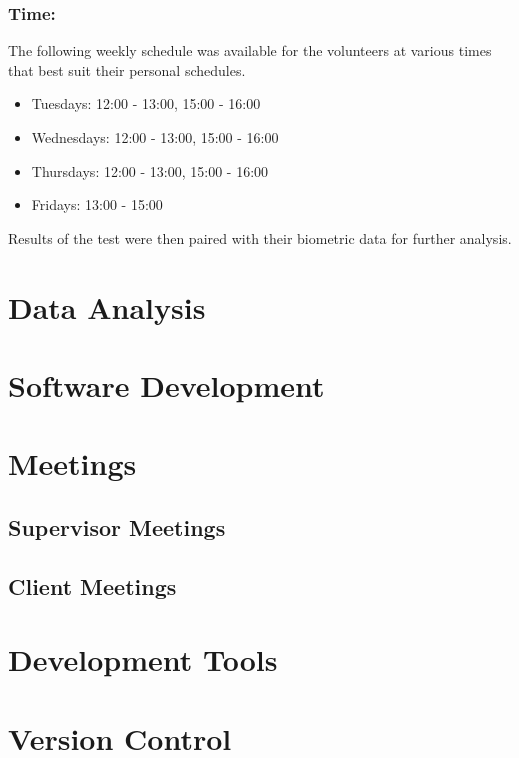 \subsubsection*{Time:}

The following weekly schedule was available for the volunteers at various times that best suit their personal schedules.
\begin{itemize}
    \item Tuesdays: 12:00 - 13:00, 15:00 - 16:00
    \item Wednesdays: 12:00 - 13:00, 15:00 - 16:00
    \item Thursdays: 12:00 - 13:00, 15:00 - 16:00
    \item Fridays: 13:00 - 15:00
\end{itemize}

Results of the test were then paired with their biometric data for further analysis.

\section{Data Analysis}

\section{Software Development}

\section{Meetings}
\subsection{Supervisor Meetings}

\subsection{Client Meetings}

\section{Development Tools}

\section{Version Control}
